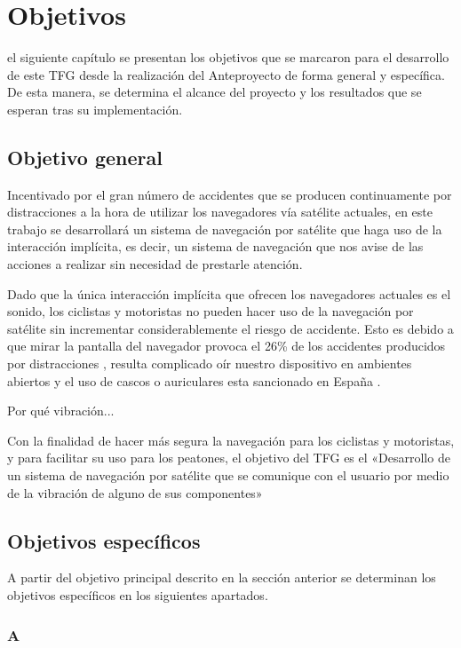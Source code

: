 \chapter{Objetivos}
\label{chap:objetivos}

 el siguiente capítulo se presentan los objetivos que se marcaron para el desarrollo de
este \acf{TFG} desde la realización del Anteproyecto de forma general y específica. De esta manera,
se determina el alcance del proyecto y los resultados que se esperan tras su implementación.

\section{Objetivo general}

Incentivado por el gran número de accidentes que se producen continuamente por distracciones a la
hora de utilizar los navegadores vía satélite actuales, en este trabajo se desarrollará un sistema
de navegación por satélite que haga uso de la interacción implícita, es decir, un sistema de
navegación que nos avise de las acciones a realizar sin necesidad de prestarle atención.

Dado que la única interacción implícita que ofrecen los navegadores actuales es el sonido, los
ciclistas y motoristas no pueden hacer uso de la navegación por satélite sin incrementar
considerablemente el riesgo de accidente. Esto es debido a que mirar la pantalla del navegador
provoca el 26\% de los accidentes producidos por distracciones \cite{Allianz14}, resulta complicado
oír nuestro dispositivo en ambientes abiertos y el uso de cascos o auriculares esta sancionado en
España \cite{Serrano14}.

Por qué vibración...

Con la finalidad de hacer más segura la navegación para los ciclistas y motoristas, y para facilitar
su uso para los peatones, el objetivo del \acf{TFG} es el «Desarrollo de un sistema de navegación
  por satélite que se comunique con el usuario por medio de la vibración de alguno de sus
  componentes»

\section{Objetivos específicos}

A partir del objetivo principal descrito en la sección anterior se determinan los objetivos
específicos en los siguientes apartados.

\subsection{A}


